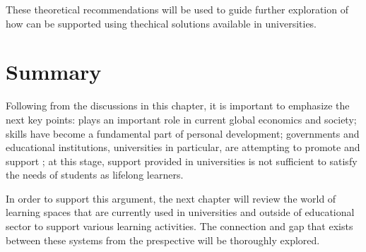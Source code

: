 These theoretical recommendations will be used to guide further exploration of
 how \LLLs can be supported using thechical solutions available in universities.

\section{Summary} 

Following from the discussions in this chapter, it is important to emphasize
the next key points: \LLLs plays an important role in current global economics
and society; \LLLs skills have become a fundamental part of personal
development; governments and educational institutions, universities in
particular, are attempting to promote and support \LLLsn; at this stage, \LLLs
support provided in universities is not sufficient to satisfy the needs of
students as lifelong learners.

In order to support this argument, the next chapter will review the world of
learning spaces that are currently used in universities and outside of
educational sector to support various learning activities. The connection and
gap that exists between these systems from the \LLLs prespective will be
thoroughly explored.
